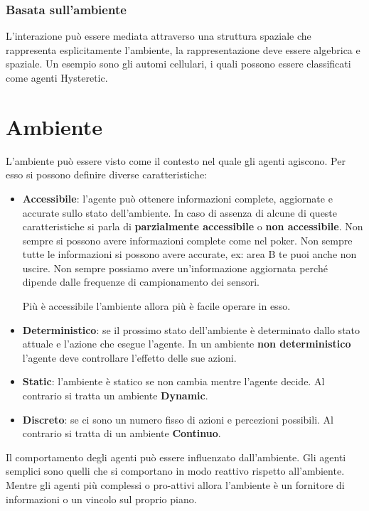 \subsubsection{Basata sull'ambiente}
L'interazione può essere mediata attraverso una struttura spaziale che
rappresenta esplicitamente l'ambiente, la rappresentazione deve essere algebrica
e spaziale. Un esempio sono gli automi cellulari, i quali possono essere
classificati come agenti Hysteretic.
\section{Ambiente}
L'ambiente può essere visto come il contesto nel quale gli agenti agiscono. Per
esso si possono definire diverse caratteristiche:
\begin{itemize}
    \item \textbf{Accessibile}: l'agente può ottenere informazioni complete,
          aggiornate e accurate sullo stato dell'ambiente. In caso di assenza di
          alcune di queste caratteristiche si parla di \textbf{parzialmente
              accessibile} o \textbf{non accessibile}.
          Non sempre si possono avere informazioni complete come nel poker.
          Non sempre tutte le informazioni si possono avere accurate, ex: area
          B te puoi anche non uscire. Non sempre possiamo avere un'informazione
          aggiornata perché dipende dalle frequenze di campionamento dei sensori.

          Più è accessibile l'ambiente allora più è facile operare in esso.
    \item \textbf{Deterministico}: se il prossimo stato dell'ambiente è determinato
          dallo stato attuale e l'azione che esegue l'agente. In un ambiente 
          \textbf{non deterministico} l'agente deve controllare l'effetto delle 
          sue azioni.
    \item \textbf{Static}: l'ambiente è statico se non cambia mentre
          l'agente decide. Al contrario si tratta un ambiente \textbf{Dynamic}.
    \item \textbf{Discreto}: se ci sono un numero fisso di azioni e percezioni
          possibili. Al contrario si tratta di un ambiente \textbf{Continuo}.
\end{itemize}

Il comportamento degli agenti può essere influenzato dall'ambiente. Gli agenti
semplici sono quelli che si comportano in modo reattivo rispetto all'ambiente.
Mentre gli agenti più complessi o pro-attivi allora l'ambiente è un fornitore di
informazioni o un vincolo sul proprio piano.

